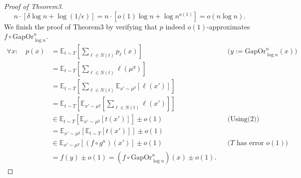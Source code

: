 \begin{proof}[Proof of Theorem3]
\[n\cdot[\delta\log n+\log(1/\epsilon)]=n\cdot[o(1)\log n+\log n^{o(1)}]=o(n\log n).\]
We finish the proof of Theorem3 by verifying that $p$ indeed $o(1)$-approximates $f\circ\mathrm{GapOr}_{\log n}^n$.
\begin{align*}
\forall x:\quad p(x)&=\mathbb E_{t\sim T}\left[\sum_{\ell\in N(t)}p_\ell(x)\right]&&\bigl(y:=\mathrm{GapOr}_{\log n}^n(x)\bigr)\\
&=\mathbb E_{t\sim T}\left[\sum_{\ell\in N(t)}\ell(\mu^y)\right]\\
&=\mathbb E_{t\sim T}\left[\sum_{\ell\in N(t)}\mathbb E_{x'\sim\mu^y}[\ell(x')]\right]\\
&=\mathbb E_{t\sim T}\left[\mathbb E_{x'\sim\mu^y}\left[\sum_{\ell\in N(t)}\ell(x')\right]\right]\\
&\in\mathbb E_{t\sim T}\left[\mathbb E_{x'\sim\mu^y}[t(x')]\right]\pm o(1)&&\text{(Using(2))}\\
&=\mathbb E_{x'\sim\mu^y}\left[\mathbb E_{t\sim T}[t(x')]\right]\pm o(1)\\
&\in\mathbb E_{x'\sim\mu^y}[(f\circ g^n)(x')]\pm o(1)&&\text{($T$ has error $o(1)$)}\\
&=f(y)\pm o(1)=(f\circ\mathrm{GapOr}_{\log n}^n)(x)\pm o(1).
\end{align*}
\end{proof}
